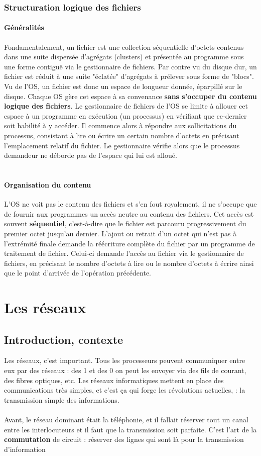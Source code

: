 \documentclass[12pt,a4paper]{report}
\begin{document}
\subsection{Structuration logique des fichiers}
\subsubsection{Généralités}
Fondamentalement, un fichier est une collection séquentielle d'octets contenus dans une suite dispersée d'agrégats (clusters) et présentée au programme sous une forme contiguë via le gestionnaire de fichiers. Par contre vu du disque dur, un fichier est réduit à une suite "éclatée" d'agrégats à prélever sous forme de "blocs". Vu de l'OS, un fichier est donc un espace de longueur donnée, éparpillé sur le disque. Chaque OS gère cet espace à sa convenance  \textbf{sans s'occuper du contenu logique des fichiers}. Le gestionnaire de fichiers de l'OS se limite à allouer cet espace à un programme en exécution (un processus) en vérifiant que ce-dernier soit habilité à y accéder. Il commence alors à répondre aux sollicitations du processus, consistant à lire ou écrire un certain nombre d'octets en précisant l'emplacement relatif du fichier. Le gestionnaire vérifie alors que le processus demandeur ne déborde pas de l'espace qui lui est alloué.\\
\\
\subsubsection{Organisation du contenu}
L'OS ne voit pas le contenu des fichiers et s'en fout royalement, il ne s'occupe que de fournir aux programmes un accès neutre au contenu des fichiers. Cet accès est souvent \textbf{séquentiel}, c'est-à-dire que le fichier est parcouru progressivement du premier octet jusqu'au dernier. L'ajout ou retrait d'un octet qui n'est pas à l'extrémité finale demande la réécriture complète du fichier par un programme de traitement de fichier. Celui-ci demande l'accès au fichier via le gestionnaire de fichiers, en précisant le nombre d'octets à lire ou le nombre d'octets à écrire ainsi que le point d'arrivée de l'opération précédente.


\chapter{Les réseaux}
\section{Introduction, contexte}
Les réseaux, c'est important. Tous les processeurs peuvent communiquer entre eux par des réseaux : des 1 et des 0 on peut les envoyer via des fils de courant, des fibres optiques, etc. Les réseaux informatiques mettent en place des communications très simples, et c'est ça qui forge les révolutions actuelles, : la transmission simple des informations.\\
\\
Avant, le réseau dominant était la téléphonie, et il fallait réserver tout un canal entre les interlocuteurs et il faut que la transmission soit parfaite. C'est l'art de la \textbf{commutation} de circuit : réserver des lignes qui sont là pour la transmission d'information
\end{document}
